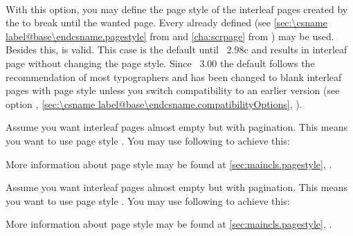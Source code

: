 \begin{Declaration}
  \\
\end{Declaration}%
%
%
With this option, you may define the page style of the
interleaf pages created by the  to break until the
wanted page. Every already defined  (see
\autoref{sec:\csname label@base\endcsname.pagestyle} from
 and
\autoref{cha:scrpage} from ) may be used. Besides this,
 is valid. This case is the default
until \KOMAScript~2.98c and results in interleaf page without changing the
page style. Since \KOMAScript~3.00 the default
follows the recommendation of most typographers and has been changed to blank
interleaf pages with page style  unless you switch
compatibility to an earlier version (see option ,
\autoref{sec:\csname label@base\endcsname.compatibilityOptions},
).
\ifCommonmaincls
\begin{Example}
  \label{desc:maincls.option.cleardoublepage.example}
  Assume you want interleaf pages almost empty but with pagination. This
  means you want to use page style . You may use following to
  achieve this:
\begin{lstcode}
\end{lstcode}
  More information about page style  may be found at
  \autoref{sec:maincls.pagestyle}, .
\end{Example}
\fi
\ifCommonscrextend
\begin{Example}
  \label{desc:scrextend.option.cleardoublepage.example}
  Assume you want interleaf pages almost empty but with pagination. This
  means you want to use page style . You may use following to
  achieve this:
\begin{lstcode}
\end{lstcode}
  More information about page style  may be found at
  \autoref{sec:maincls.pagestyle}, .
\end{Example}
\fi
{}%



